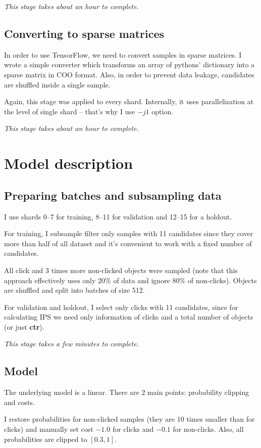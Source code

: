 \documentclass[12pt]{article}
\begin{document}
\textit{This stage takes about an hour to complete.}


\subsection{Converting to sparse matrices}
In order to use TensorFlow, we need to convert samples in sparse matrices. I wrote a simple converter which transforms an array of pythons' dictionary into a sparse matrix in COO format. Also, in order to prevent data leakage, candidates are shuffled inside a single sample.

Again, this stage was applied to every shard. Internally, it uses parallelization at the level of single shard -- that's why I use $-j1$ option.

\textit{This stage takes about an hour to complete.}


\section{Model description}

\subsection{Preparing batches and subsampling data}
I use shards 0--7 for training, 8--11 for validation and 12--15 for a holdout.

For training, I subsample filter only samples with 11 candidates since they cover more than half of all dataset and it's convenient to work with a fixed number of candidates.

All click and 3 times more non-clicked objects were sampled (note that this approach effectively uses only 20\% of data and ignore 80\% of non-clicks). 
Objects are shuffled and split into batches of size 512.

For validation and holdout, I select only clicks with 11 candidates, since for calculating IPS we need only information of clicks and a total number of objects (or just \textbf{ctr}).

\textit{This stage takes a few minutes to complete.}

\subsection{Model}
The underlying model is a linear. There are 2 main points: probability clipping and costs.

I restore probabilities for non-clicked samples (they are $10$ times smaller than for clicks) and manually set cost $-1.0$ for clicks and $-0.1$ for non-clicks. Also, all probabilities are clipped to $[0.3, 1]$.
\end{document}
